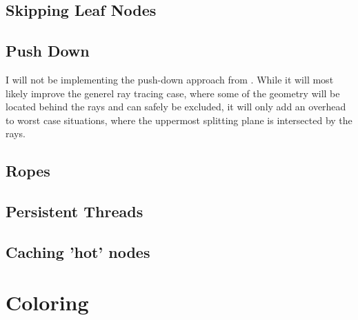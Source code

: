 \subsection{Skipping Leaf Nodes}



\subsection{Push Down}

I will not be implementing the push-down approach from
. While it will most likely improve the generel ray
tracing case, where some of the geometry will be located behind the
rays and can safely be excluded, it will only add an overhead to worst
case situations, where the uppermost splitting plane is intersected by
the rays.

\subsection{Ropes}


\subsection{Persistent Threads}


\subsection{Caching 'hot' nodes}





\section{Coloring}

